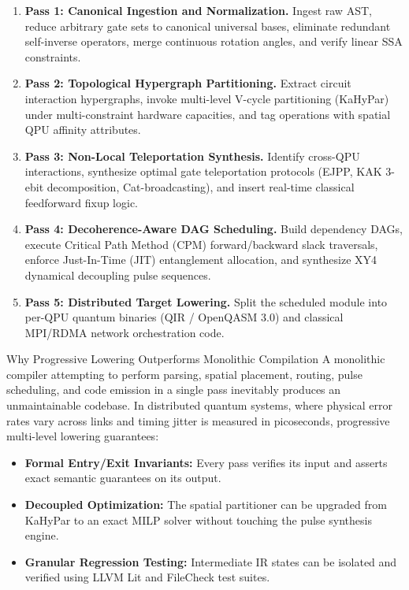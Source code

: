 \begin{enumerate}
    \item \textbf{Pass 1: Canonical Ingestion and Normalization.} Ingest raw AST, reduce arbitrary gate sets to canonical universal bases, eliminate redundant self-inverse operators, merge continuous rotation angles, and verify linear SSA constraints.
    \item \textbf{Pass 2: Topological Hypergraph Partitioning.} Extract circuit interaction hypergraphs, invoke multi-level V-cycle partitioning (KaHyPar) under multi-constraint hardware capacities, and tag operations with spatial QPU affinity attributes.
    \item \textbf{Pass 3: Non-Local Teleportation Synthesis.} Identify cross-QPU interactions, synthesize optimal gate teleportation protocols (EJPP, KAK 3-ebit decomposition, Cat-broadcasting), and insert real-time classical feedforward fixup logic.
    \item \textbf{Pass 4: Decoherence-Aware DAG Scheduling.} Build dependency DAGs, execute Critical Path Method (CPM) forward/backward slack traversals, enforce Just-In-Time (JIT) entanglement allocation, and synthesize XY4 dynamical decoupling pulse sequences.
    \item \textbf{Pass 5: Distributed Target Lowering.} Split the scheduled module into per-QPU quantum binaries (QIR / OpenQASM 3.0) and classical MPI/RDMA network orchestration code.
\end{enumerate}

\begin{insightbox}{Why Progressive Lowering Outperforms Monolithic Compilation}
A monolithic compiler attempting to perform parsing, spatial placement, routing, pulse scheduling, and code emission in a single pass inevitably produces an unmaintainable codebase. In distributed quantum systems, where physical error rates vary across links and timing jitter is measured in picoseconds, progressive multi-level lowering guarantees:
\begin{itemize}
    \item \textbf{Formal Entry/Exit Invariants:} Every pass verifies its input and asserts exact semantic guarantees on its output.
    \item \textbf{Decoupled Optimization:} The spatial partitioner can be upgraded from KaHyPar to an exact MILP solver without touching the pulse synthesis engine.
    \item \textbf{Granular Regression Testing:} Intermediate IR states can be isolated and verified using LLVM Lit and FileCheck test suites.
\end{itemize}
\end{insightbox}

